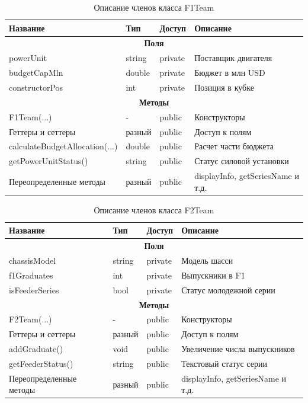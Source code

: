 \begin{table}[htbp]
\centering
\caption{Описание членов класса F1Team}
\begin{tabular}{|p{5.5cm}|p{3cm}|p{2cm}|p{5cm}|}
\hline
\textbf{Название} & \textbf{Тип} & \textbf{Доступ} & \textbf{Описание} \\ \hline
\multicolumn{4}{|c|}{\textbf{Поля}} \\ \hline
powerUnit & string & private & Поставщик двигателя \\ \hline
budgetCapMln & double & private & Бюджет в млн USD \\ \hline
constructorPos & int & private & Позиция в кубке \\ \hline
\multicolumn{4}{|c|}{\textbf{Методы}} \\ \hline
F1Team(...) & - & public & Конструкторы \\ \hline
Геттеры и сеттеры & разный & public & Доступ к полям \\ \hline
calculateBudgetAllocation(...) & double & public & Расчет части бюджета \\ \hline
getPowerUnitStatus() & string & public & Статус силовой установки \\ \hline
Переопределенные методы & разный & public & displayInfo, getSeriesName и т.д. \\ \hline
\end{tabular}
\end{table}

\begin{table}[htbp]
\centering
\caption{Описание членов класса F2Team}
\begin{tabular}{|p{5.5cm}|p{3cm}|p{2cm}|p{5cm}|}
\hline
\textbf{Название} & \textbf{Тип} & \textbf{Доступ} & \textbf{Описание} \\ \hline
\multicolumn{4}{|c|}{\textbf{Поля}} \\ \hline
chassisModel & string & private & Модель шасси \\ \hline
f1Graduates & int & private & Выпускники в F1 \\ \hline
isFeederSeries & bool & private & Статус молодежной серии \\ \hline
\multicolumn{4}{|c|}{\textbf{Методы}} \\ \hline
F2Team(...) & - & public & Конструкторы \\ \hline
Геттеры и сеттеры & разный & public & Доступ к полям \\ \hline
addGraduate() & void & public & Увеличение числа выпускников \\ \hline
getFeederStatus() & string & public & Текстовый статус серии \\ \hline
Переопределенные методы & разный & public & displayInfo, getSeriesName и т.д. \\ \hline
\end{tabular}
\end{table}


